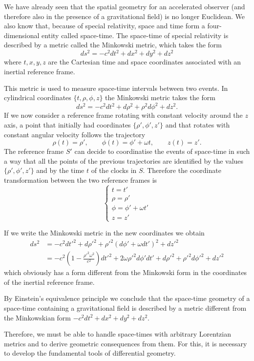 \begin{points}
\item We have already seen that the spatial geometry for an accelerated observer (and therefore also in the presence of a gravitational field) is no longer Euclidean. We also know that, because of special relativity, space and time form a four-dimensional entity called space-time. The space-time of special relativity is described by a metric called the Minkowski metric, which takes the form
\[
  ds^2=-c^2dt^2+dx^2+dy^2+dz^2
\]
where $t,x,y,z$ are the Cartesian time and space coordinates associated with an inertial reference frame.

\item This metric is used to measure space-time intervals between two events. In cylindrical coordinates $\{t,\rho,\phi,z\}$ the Minkowski metric takes the form
\[
  ds^2=-c^2dt^2+d\rho^2+\rho^2d\phi^2+dz^2 .
\]
If we now consider a reference frame rotating with constant velocity around the $z$ axis, a point that initially had coordinates $\{\rho',\phi',z'\}$ and that rotates with constant angular velocity follows the trajectory
\[
  \rho(t)=\rho',\qquad\phi(t)=\phi'+\omega t,\qquad z(t)=z' .
\]
The reference frame $S'$ can decide to coordinatise the events of space-time in such a way that all the points of the previous trajectories are identified by the values $\{\rho',\phi',z'\}$ and by the time $t$ of the clocks in $S$. Therefore the coordinate transformation between the two reference frames is
\[
  \left\{\begin{array}{l}t=t'\\ \rho=\rho'\\ \phi=\phi'+\omega t'\\ z=z'\end{array}\right.
\]

\item If we write the Minkowski metric in the new coordinates we obtain
\begin{align*}
  ds^2&=-c^2dt'^2+d\rho'^2+\rho'^2\left(d\phi'+\omega dt'\right)^2+dz'^2\\
  &=-c^2\left(1-\frac{\rho'^2\omega^2}{c^2}\right)dt'^2+2\omega\rho'^2d\phi'dt'+d\rho'^2+\rho'^2d\phi'^2+dz'^2
\end{align*}
which obviously has a form different from the Minkowski form in the coordinates of the inertial reference frame.

\item By Einstein's equivalence principle we conclude that the space-time geometry of a space-time containing a gravitational field is described by a metric different from the Minkowskian form $-c^2dt^2+dx^2+dy^2+dz^2$.

\item Therefore, we must be able to handle space-times with arbitrary Lorentzian metrics and to derive geometric consequences from them. For this, it is necessary to develop the fundamental tools of differential geometry.
\end{points}
